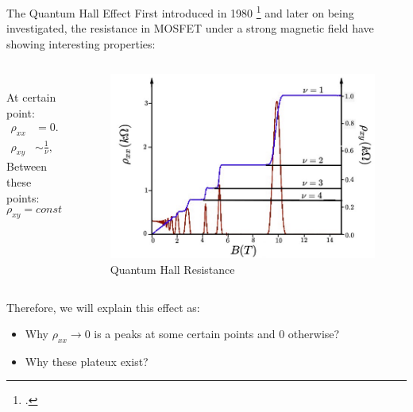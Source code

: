 \documentclass{beamer}
\begin{document}
\begin{frame}{The Quantum Hall Effect}
\quad First introduced in 1980 \footcite{Kitzling_1980} and later on being investigated, the resistance in MOSFET under a strong magnetic field have showing interesting properties:\null\\
\begin{columns}
\begin{column}{0.5\textwidth}
\\
\quad At certain point:
\begin{align*}
	\rho_{xx} &= 0.\\
	\rho_{xy} &\sim \frac{1}{\nu}, \quad \nu \in \mathbb{N}
\end{align*}
\quad Between these points:
$$\rho_{xy} = const.$$
\end{column}
\begin{column}{0.5\textwidth}
\begin{figure}
	\includegraphics[width=0.8\linewidth]{Images/Rhoxy.jpg}
\caption{Quantum Hall Resistance
	\cite*[Taken from ][]{manchesterAdvancedQuantum}}
\label{Fig: QHE}
\end{figure}
\end{column}
\end{columns}
\begin{center}
\end{center}
\end{frame}
\begin{frame}
\quad Therefore, we will explain this effect as:
\begin{itemize}
	\item Why \(\rho_{xx} \to 0\) is a peaks at some certain points and \(0\) otherwise?
	\item Why these plateux exist?
\end{itemize}
\end{frame}
\end{document}
